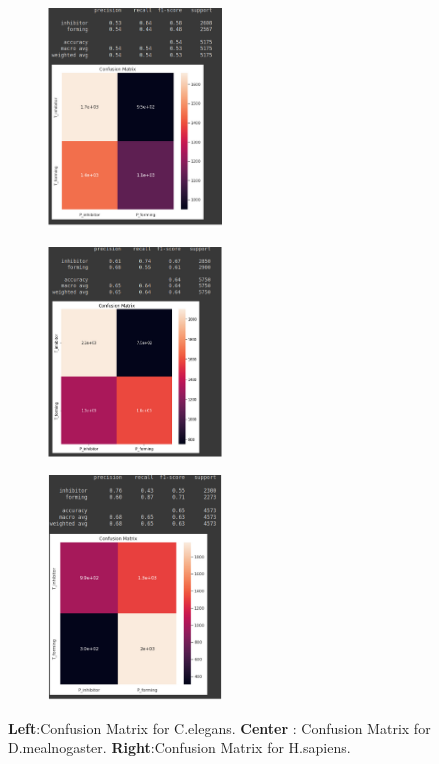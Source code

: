 \documentclass{article}
\begin{document}
\begin{figure}[]
  \centering
  \begin{subfigure}{4.6cm}
    \centering\includegraphics[width=4.6cm]{C_elegans_cm.png}
  \end{subfigure}
  \begin{subfigure}{4.6cm}
    \centering\includegraphics[width=4.6cm]{D.mealnogaster_cm.png}
  \end{subfigure}
  \begin{subfigure}{4.6cm}
    \centering\includegraphics[width=4.6cm]{sapiens_cm.png}
  \end{subfigure}
  \caption{ 
  \textbf{Left}:Confusion Matrix for  C.elegans.
  \textbf{Center} : Confusion Matrix for  D.mealnogaster.
  \textbf{Right}:Confusion Matrix for  H.sapiens.}
  \label{fig:Confusion_matrix}
\end{figure}
\end{document}
